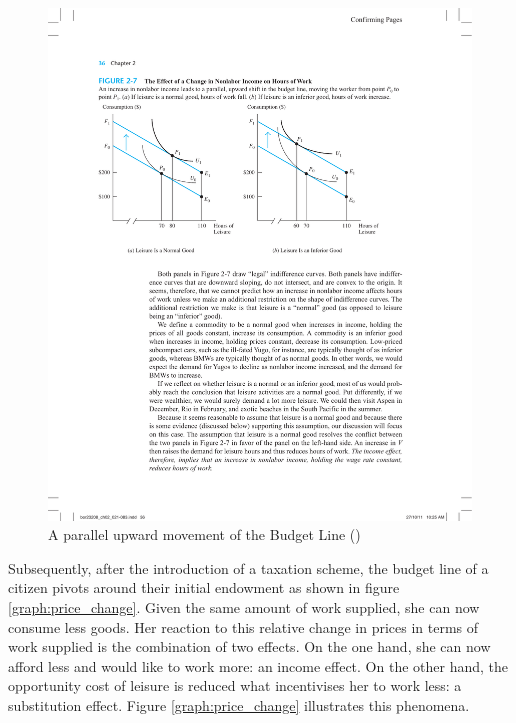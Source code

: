 \begin{figure}[ht!]
    \centering
    \includegraphics{graphs/budget_line_2.pdf}
    \caption{A parallel upward movement of the Budget Line (\cite{borjas2012})}
    \label{graph:budgetline2}
\end{figure}


Subsequently, after the introduction of a taxation scheme, the budget line of a citizen pivots around their initial endowment as shown in figure \ref{graph:price_change}. Given the same amount of work supplied, she can now consume less goods. Her reaction to this relative change in prices in terms of work supplied is the combination of two effects. On the one hand, she can now afford less and would like to work more: an income effect. On the other hand, the opportunity cost of leisure is reduced what incentivises her to work less: a substitution effect. Figure \ref{graph:price_change} illustrates this phenomena.\\

